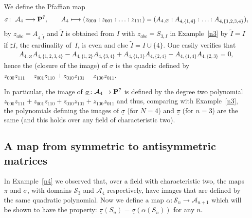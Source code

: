 \documentclass[10pt,a4paper]{amsart}
\newcommand{\PP}{{\bf P}}
\newcommand{\cA}{{\cal A}}
\newcommand{\cS}{{\cal S}}
\newcommand{\tI}{{\tilde{I}}}
\numberwithin{equation}{section}
\providecommand{\cal}{\mathcal}
\begin{document}
\begin{Example}[the case $N=4$]\label{n4}
We define the Pfaffian map
\begin{gather*}
\sigma\colon \ \cA_4 \longrightarrow \PP^7,\qquad A_4 \longmapsto (z_{000}:z_{001}:\ldots:z_{111})= (A_{4,\varnothing}:A_{4,\{1,4\}}:\ldots:A_{4,\{1,2,3,4\}}),
\end{gather*}
by $z_{abc}=A_{4,\tilde{I}}$ and $\tI$ is obtained from $I$ with $z_{abc}=S_{3,I}$ in Example~\ref{n3} by $\tI=I$ if $\sharp I$, the cardinality of~$I$, is even and else $\tI=I\cup\{4\}$. One easily verifies that
\begin{gather*}
A_{4,\varnothing}A_{4,\{1,2,3,4\}} - A_{4,\{1,2\}}A_{4,\{3,4\}}+ A_{4,\{1,3\}}A_{4,\{2,4\}}-A_{4,\{1,4\}}A_{4,\{2,3\}} = 0,
\end{gather*}
hence the (closure of the image) of $\sigma$ is the quadric defined by $z_{000}z_{111}-z_{001}z_{110}+z_{010}z_{101}-z_{100}z_{011}$.

In particular, the image of $\underline{\sigma}\colon \cA_4\rightarrow\PP^{7}$ is defined by the degree two polynomial $z_{000}z_{111}+z_{001}z_{110}+z_{010}z_{101}+z_{100}z_{011}$ and thus, comparing with Example~\ref{n3}, the polynomials defining the images of $\underline{\sigma}$ (for $N=4$) and $\underline{\pi}$ (for $n=3$) are the same (and this holds over any field of characteristic two).
\end{Example}

\subsection{A map from symmetric to antisymmetric matrices}\label{mapsa}
In Example~\ref{n4} we observed that, over a field with characteristic two, the maps $\underline{\pi}$ and $\underline{\sigma}$, with domains $\cS_3$ and $\cA_4$ respectively, have images that are defined by the same quadratic polynomial. Now we define a map $\alpha\colon \cS_n\rightarrow\cA_{n+1}$ which will be shown
to have the property:
$\underline{\pi}(S_n)=\underline{\sigma}(\alpha(S_n))$ for any $n$.
\end{document}

